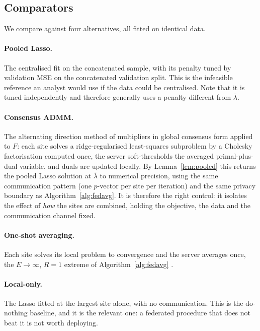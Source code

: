 \subsection{Comparators}

We compare against four alternatives, all fitted on identical data.

\paragraph{Pooled Lasso.} The centralised fit on the concatenated sample,
with its penalty tuned by validation MSE on the concatenated validation
split. This is the infeasible reference an analyst would use if the data
could be centralised. Note that it is tuned independently and therefore
generally uses a penalty different from $\bar\lambda$.

\paragraph{Consensus ADMM.} The alternating direction method of multipliers
in global consensus form \citep{boyd2011} applied to $F$: each site solves a
ridge-regularised least-squares subproblem by a Cholesky factorisation
computed once, the server soft-thresholds the averaged primal-plus-dual
variable, and duals are updated locally. By Lemma~\ref{lem:pooled} this
returns the pooled Lasso solution at $\bar\lambda$ to numerical precision,
using the same communication pattern (one $p$-vector per site per
iteration) and the same privacy boundary as
Algorithm~\ref{alg:fedavg}. It is therefore the right control: it isolates
the effect of \emph{how} the sites are combined, holding the objective, the
data and the communication channel fixed.

\paragraph{One-shot averaging.} Each site solves its local problem to
convergence and the server averages once, the $E \to \infty$, $R = 1$
extreme of Algorithm~\ref{alg:fedavg}
\citep{lee2017,battey2018}.

\paragraph{Local-only.} The Lasso fitted at the largest site alone, with no
communication. This is the do-nothing baseline, and it is the relevant one:
a federated procedure that does not beat it is not worth deploying.

